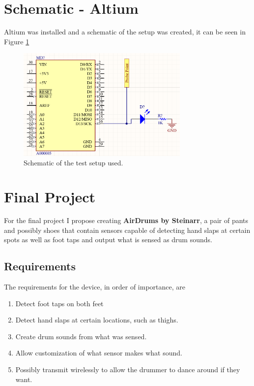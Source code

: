 \documentclass{article}
\begin{document}
\section{Schematic - Altium}
Altium was installed and a schematic of the setup was created, it can be seen in Figure \ref{hw1:fig:schematic}
\begin{figure}[h!]
    \centering
    \includegraphics[width=0.75\textwidth]{HW1/schematic.PNG}
    \caption{Schematic of the test setup used.}
    \label{hw1:fig:schematic}
\end{figure}



\newpage
\section{Final Project}
For the final project I propose creating \textbf{AirDrums by Steinarr}, a pair of pants and possibly shoes that contain sensors capable of detecting hand slaps at certain spots as well as foot taps and output what is sensed as drum sounds.

\subsection{Requirements}
The requirements for the device, in order of importance, are
\begin{enumerate}
    \item Detect foot taps on both feet
    \item Detect hand slaps at certain locations, such as thighs.
    \item Create drum sounds from what was sensed.
    \item Allow customization of what sensor makes what sound.
    \item Possibly transmit wirelessly to allow the drummer to dance around if they want.
\end{enumerate}
\end{document}

